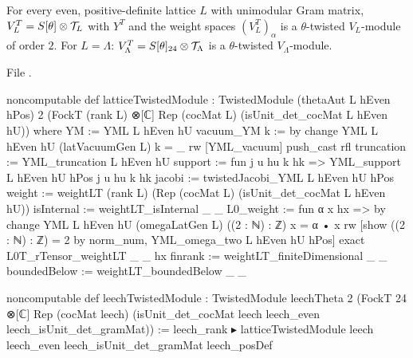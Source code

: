 \begin{theorem}\label{ch08:thm:latticeTwistedModule}
For every even, positive-definite lattice $L$ with unimodular Gram matrix, $V_L^T=S[\theta]\otimes\mathcal{T}_L$
with $Y^T$ and the weight spaces $(V_L^T)_\alpha$ is a $\theta$-twisted $V_L$-module of order $2$.
For $L=\Lambda$: $V_\Lambda^T=S[\theta]_{24}\otimes\mathcal{T}_\Lambda$ is a $\theta$-twisted
$V_\Lambda$-module.
\end{theorem}
\noindent File .
\begin{leancode}
noncomputable def latticeTwistedModule :
    TwistedModule (thetaAut L hEven hPos) 2
      (FockT (rank L) ⊗[ℂ] Rep (cocMat L) (isUnit_det_cocMat L hEven hU)) where
  YM := YML L hEven hU
  vacuum_YM k := by
    change YML L hEven hU (latVacuumGen L) k = _
    rw [YML_vacuum]
    push_cast
    rfl
  truncation := YML_truncation L hEven hU
  support := fun j u hu k hk => YML_support L hEven hU hPos j u hu k hk
  jacobi := twistedJacobi_YML L hEven hU hPos
  weight := weightLT (rank L) (Rep (cocMat L) (isUnit_det_cocMat L hEven hU))
  isInternal := weightLT_isInternal _ _
  L0_weight := fun α x hx => by
    change YML L hEven hU (omegaLatGen L) ((2 : ℕ) : ℤ) x = α • x
    rw [show ((2 : ℕ) : ℤ) = 2 by norm_num, YML_omega_two L hEven hU hPos]
    exact L0T_rTensor_weightLT _ _ hx
  finrank := weightLT_finiteDimensional _ _
  boundedBelow := weightLT_boundedBelow _ _

noncomputable def leechTwistedModule :
    TwistedModule leechTheta 2
      (FockT 24 ⊗[ℂ] Rep (cocMat leech) (isUnit_det_cocMat leech leech_even
        leech_isUnit_det_gramMat)) :=
  leech_rank ▸ latticeTwistedModule leech leech_even leech_isUnit_det_gramMat leech_posDef
\end{leancode}
